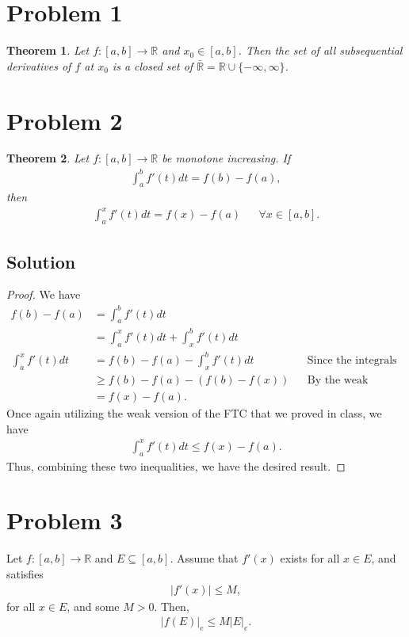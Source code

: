 \documentclass[10pt,a4paper]{article}
\author{Jeremiah Givens}
\theoremstyle{theorem}
\newtheorem{theorem}{Theorem}
\theoremstyle{definition}
\begin{document}
\section*{Problem 1}
\begin{theorem}
Let $f:[a,b] \to \mathbb{R}$ and $x_0 \in [a, b]$. Then the set of all subsequential derivatives of $f$ at $x_0$ is a closed set of $\bar{\mathbb{R}} = \mathbb{R} \cup \{-\infty, \infty \}$.
\end{theorem}

\section*{Problem 2}
\begin{theorem}
Let $f:[a,b] \to \mathbb{R}$ be monotone increasing. If 
\begin{align*}
\int_a^b f'(t)dt = f(b) - f(a),
\end{align*}
then
\begin{align*}
\int_a^x f'(t)dt = f(x) - f(a) && \forall x \in [a, b].
\end{align*}
\end{theorem}

\subsection*{Solution}
\begin{proof}
We have
\begin{align*}
f(b) - f(a) &= \int_a^b f'(t)dt\\
&= \int_a^x f'(t)dt + \int_x^b f'(t)dt\\
\int_a^x f'(t)dt &= f(b) - f(a) - \int_x^b f'(t)dt &&\text{Since the integrals are finite}\\
&\geq f(b) - f(a) - (f(b) - f(x)) &&\text{By the weak version of FTC}\\
&= f(x) - f(a).
\end{align*}
Once again utilizing the weak version of the FTC that we proved in class, we have
\begin{align*}
\int_a^x f'(t)dt \leq f(x) - f(a).
\end{align*}
Thus, combining these two inequalities, we have the desired result.
\end{proof}

\section*{Problem 3}
Let $f:[a,b] \to \mathbb{R}$ and $E \subseteq [a, b]$. Assume that $f'(x)$ exists for all $x \in E$, and satisfies 
\begin{align*}
|f'(x)| \leq M,
\end{align*}
for all $x \in E$, and some $M > 0$. Then,
\begin{align*}
|f(E)|_e \leq M |E|_e.
\end{align*}
\end{document}
